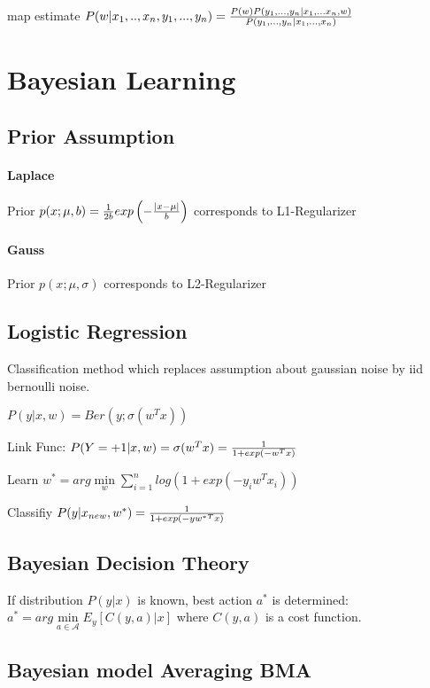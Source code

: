 \documentclass[11pt,twocolumn]{article}
\begin{document}
map estimate $P(w|x_1,..,x_n,y_1,...,y_n) = {{P(w)P(y_1,...,y_n|x_1,...x_n,w)}\over{P(y_1,...,y_n|x_1,...,x_n)}}$	
	
\section{Bayesian Learning}

\subsection{Prior Assumption}

\paragraph{Laplace} Prior $p(x;\mu, b) = {1 \over {2b}} exp \left( - {{|x - \mu|}\over{b}} \right)$ corresponds to L1-Regularizer

\paragraph{Gauss} Prior $p(x;\mu, \sigma)$ corresponds to L2-Regularizer

\subsection{Logistic Regression}
Classification method which replaces assumption about gaussian noise by iid bernoulli noise.

$P(y|x,w) = Ber(y; \sigma(w^Tx))$


Link Func: $P(Y=+1|x,w) =  \sigma(w^Tx) = 	{1 \over {1+exp(-w^Tx)}}$

Learn $w^* = arg \min \limits_w \sum \limits_{i=1}^n log \left( 1 + exp(-y_iw^Tx_i) \right)$

Classifiy $P(y|x_{new}, w^* ) = {1 \over {1+exp(-y{w^*}^Tx)}}$

\subsection{Bayesian Decision Theory}

If distribution $P(y|x)$ is known, best action $a^*$ is determined: $a^* = arg \min \limits_{a \in \mathcal{A}} E_y[C(y,a)|x]$ where $C(y,a)$ is a cost function.




\subsection{Bayesian model Averaging BMA}
\end{document}
